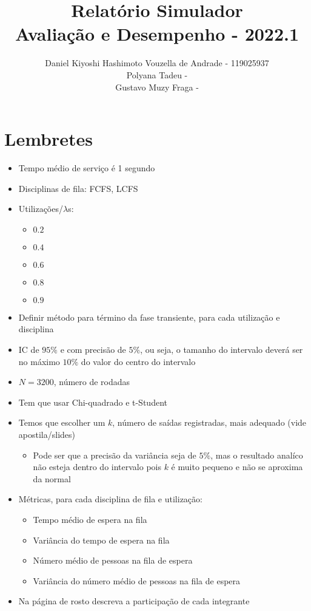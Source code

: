 \documentclass[a4paper]{article}
\title{Relatório Simulador\\
  Avaliação e Desempenho - 2022.1}
\author{Daniel Kiyoshi Hashimoto Vouzella de Andrade - 119025937
  \\
Polyana Tadeu -
  \\
Gustavo Muzy Fraga -
}
\date{}
\begin{document}
\maketitle

\section*{Lembretes}
\begin{itemize}
    \item Tempo médio de serviço é 1 segundo
    \item Disciplinas de fila: FCFS, LCFS
    \item Utilizações/\(\lambda\)s:
    \begin{itemize}
        \item \(0.2\)
        \item \(0.4\)
        \item \(0.6\)
        \item \(0.8\)
        \item \(0.9\)
    \end{itemize}
    \item Definir método para término da fase transiente,
        para cada utilização e disciplina
    \item IC de \(95\%\) e com precisão de \(5\%\),
        ou seja, o tamanho do intervalo deverá ser no máximo
        \(10\%\) do valor do centro do intervalo
    \item \(N = 3200\), número de rodadas
    \item Tem que usar Chi-quadrado e t-Student
    \item Temos que escolher um \(k\), número de saídas registradas,
        mais adequado (vide apostila/slides)
    \begin{itemize}
        \item Pode ser que a precisão da variância
            seja de \(5\%\),
            mas o resultado analíco não esteja dentro do intervalo
            pois \(k\) é muito pequeno e não se aproxima da normal
    \end{itemize}
    \item Métricas, para cada disciplina de fila e utilização:
    \begin{itemize}
        \item Tempo médio de espera na fila
        \item Variância do tempo de espera na fila
        \item Número médio de pessoas na fila de espera
        \item Variância do número médio de pessoas na fila de espera
    \end{itemize}
    \item Na página de rosto descreva
        a participação de cada integrante
\end{itemize}
\end{document}
